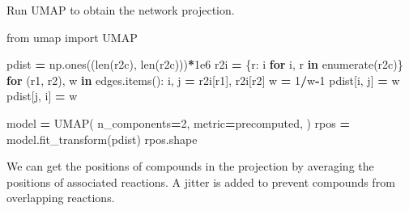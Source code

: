 \documentclass[
]{book}
\newenvironment{Shaded}{\begin{snugshade}}{\end{snugshade}}
\newcommand{\BuiltInTok}[1]{#1}
\newcommand{\ControlFlowTok}[1]{\textcolor[rgb]{0.13,0.29,0.53}{\textbf{#1}}}
\newcommand{\DecValTok}[1]{\textcolor[rgb]{0.00,0.00,0.81}{#1}}
\newcommand{\FloatTok}[1]{\textcolor[rgb]{0.00,0.00,0.81}{#1}}
\newcommand{\ImportTok}[1]{#1}
\newcommand{\KeywordTok}[1]{\textcolor[rgb]{0.13,0.29,0.53}{\textbf{#1}}}
\newcommand{\NormalTok}[1]{#1}
\newcommand{\OperatorTok}[1]{\textcolor[rgb]{0.81,0.36,0.00}{\textbf{#1}}}
\newcommand{\StringTok}[1]{\textcolor[rgb]{0.31,0.60,0.02}{#1}}
\begin{document}
Run UMAP to obtain the network projection.

\begin{Shaded}
\begin{Highlighting}[numbers=left,,]
\ImportTok{from}\NormalTok{ umap }\ImportTok{import}\NormalTok{ UMAP}

\NormalTok{pdist }\OperatorTok{=}\NormalTok{ np.ones((}\BuiltInTok{len}\NormalTok{(r2c), }\BuiltInTok{len}\NormalTok{(r2c)))}\OperatorTok{*}\FloatTok{1e6}
\NormalTok{r2i }\OperatorTok{=}\NormalTok{ \{r: i }\ControlFlowTok{for}\NormalTok{ i, r }\KeywordTok{in} \BuiltInTok{enumerate}\NormalTok{(r2c)\}}
\ControlFlowTok{for}\NormalTok{ (r1, r2), w }\KeywordTok{in}\NormalTok{ edges.items():}
\NormalTok{    i, j }\OperatorTok{=}\NormalTok{ r2i[r1], r2i[r2]}
\NormalTok{    w }\OperatorTok{=} \DecValTok{1}\OperatorTok{/}\NormalTok{w}\OperatorTok{{-}}\DecValTok{1}
\NormalTok{    pdist[i, j] }\OperatorTok{=}\NormalTok{ w}
\NormalTok{    pdist[j, i] }\OperatorTok{=}\NormalTok{ w}

\NormalTok{model }\OperatorTok{=}\NormalTok{ UMAP(}
\NormalTok{    n\_components}\OperatorTok{=}\DecValTok{2}\NormalTok{, metric}\OperatorTok{=}\StringTok{\textquotesingle{}precomputed\textquotesingle{}}\NormalTok{,}
\NormalTok{)}
\NormalTok{rpos }\OperatorTok{=}\NormalTok{ model.fit\_transform(pdist)}
\NormalTok{rpos.shape}
\end{Highlighting}
\end{Shaded}

We can get the positions of compounds in the projection by averaging the positions of associated reactions.
A jitter is added to prevent compounds from overlapping reactions.
\end{document}
